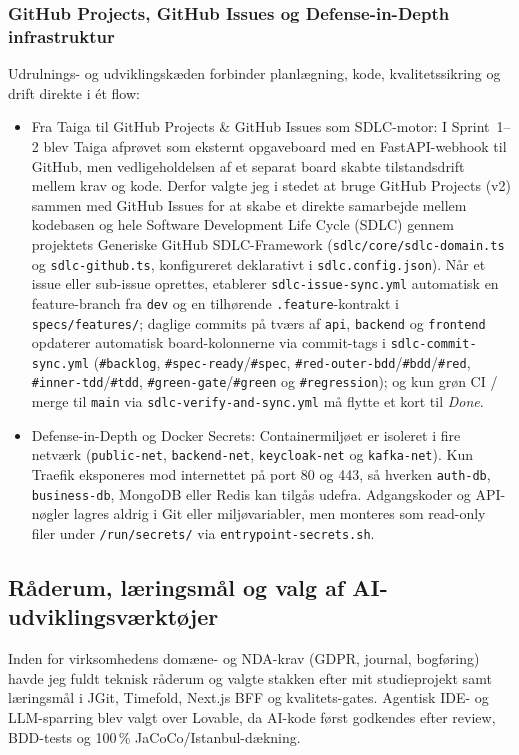 \documentclass[11pt,a4paper]{article}
\begin{document}
\subsubsection{GitHub Projects, GitHub Issues og Defense-in-Depth infrastruktur}
Udrulnings- og udviklingskæden forbinder planlægning, kode, kvalitetssikring og drift direkte i ét flow:
\begin{itemize}[noitemsep]
    \item Fra Taiga til GitHub Projects \& GitHub Issues som SDLC-motor: I Sprint~1--2 blev Taiga afprøvet som eksternt opgaveboard med en FastAPI-webhook til GitHub, men vedligeholdelsen af et separat board skabte tilstandsdrift mellem krav og kode. Derfor valgte jeg i stedet at bruge GitHub Projects (v2) sammen med GitHub Issues for at skabe et direkte samarbejde mellem kodebasen og hele Software Development Life Cycle (SDLC) gennem projektets Generiske GitHub SDLC-Framework (\texttt{sdlc/core/sdlc-domain.ts} og \texttt{sdlc-github.ts}, konfigureret deklarativt i \texttt{sdlc.config.json}). Når et issue eller sub-issue oprettes, etablerer \texttt{sdlc-issue-sync.yml} automatisk en feature-branch fra \texttt{dev} og en tilhørende \texttt{.feature}-kontrakt i \texttt{specs/features/}; daglige commits på tværs af \texttt{api}, \texttt{backend} og \texttt{frontend} opdaterer automatisk board-kolonnerne via commit-tags i \texttt{sdlc-commit-sync.yml} (\texttt{\#backlog}, \texttt{\#spec-ready}/\texttt{\#spec}, \texttt{\#red-outer-bdd}/\texttt{\#bdd}/\texttt{\#red}, \texttt{\#inner-tdd}/\texttt{\#tdd}, \texttt{\#green-gate}/\texttt{\#green} og \texttt{\#regression}); og kun grøn CI / merge til \texttt{main} via \texttt{sdlc-verify-and-sync.yml} må flytte et kort til \textit{Done}.
    \item Defense-in-Depth og Docker Secrets: Containermiljøet er isoleret i fire netværk (\texttt{public-net}, \texttt{backend-net}, \texttt{keycloak-net} og \texttt{kafka-net}). Kun Traefik eksponeres mod internettet på port 80 og 443, så hverken \texttt{auth-db}, \texttt{business-db}, MongoDB eller Redis kan tilgås udefra. Adgangskoder og API-nøgler lagres aldrig i Git eller miljøvariabler, men monteres som read-only filer under \texttt{/run/secrets/} via \texttt{entrypoint-secrets.sh}.
\end{itemize}

\subsection{Råderum, læringsmål og valg af AI-udviklingsværktøjer}
Inden for virksomhedens domæne- og NDA-krav (GDPR, journal, bogføring) havde jeg fuldt teknisk råderum og valgte stakken efter mit studieprojekt samt læringsmål i JGit, Timefold, Next.js BFF og kvalitets-gates. Agentisk IDE- og LLM-sparring blev valgt over Lovable, da AI-kode først godkendes efter review, BDD-tests og 100\,\% JaCoCo/Istanbul-dækning.
\end{document}
